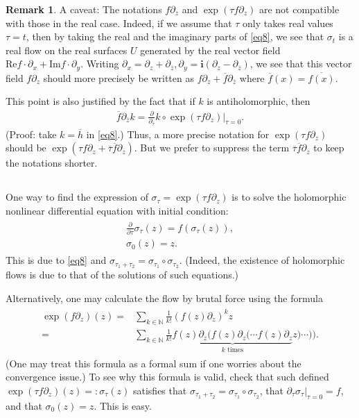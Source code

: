\documentclass[11pt,b5paper,notitlepage]{article}
\theoremstyle{definition}
\newtheorem{rem}[df]{Remark}
\theoremstyle{plain}
\newcommand{\ovl}{\overline}
\newcommand{\im}{\mathbf{i}}
\newcommand{\Nbb}{\mathbb N}
\newcommand{\Real}{\mathrm{Re}}
\newcommand{\Imag}{\mathrm{Im}}
\numberwithin{equation}{section}
\begin{document}
\begin{rem}
A caveat: The notations $f\partial_z$ and $\exp(\tau f\partial_z)$ are not compatible with those in the real case. Indeed, if we assume that $\tau$ only takes real values $\tau=t$, then by taking the real and the imaginary parts of \eqref{eq8}, we see that $\sigma_t$ is a real flow on the real surfaces $U$ generated by the real vector field $\Real f\cdot\partial_x+\Imag f\cdot \partial_y$. Writing $\partial_x=\partial_z+\partial_{\ovl z},\partial_y=\im(\partial_z-\partial_{\ovl z})$, we see that this vector field $f\partial_z$ should more precisely be written as $f\partial_z+\ovl f\partial_{\ovl z}$ where $\ovl f(x)=\ovl {f(x)}$.

This point  is also justified by the fact that if $k$ is antiholomorphic, then
\begin{align}
\ovl f\partial_{\ovl z}k=\frac\partial{\partial_{\ovl \tau}} k\circ \exp (\tau  f\partial_z)\Big|_{\tau=0}.	
\end{align}
(Proof: take $k=\ovl h$  in \eqref{eq8}.) Thus, a more precise notation for $\exp(\tau f\partial_z)$ should be $\exp(\tau f\partial_z+\ovl\tau\ovl f\partial_{\ovl z})$. But we prefer to suppress the term $\ovl\tau\ovl f\partial_{\ovl z}$ to keep the notations shorter.
\end{rem}




\subsection{}

One way to find the expression of $\sigma_\tau=\exp(\tau f\partial_z)$ is to solve the holomorphic nonlinear differential equation with initial condition:
\begin{gather}
\begin{gathered}\label{eq10}
\frac \partial{\partial\tau}\sigma_\tau(z)=f(\sigma_\tau(z)),\\
\sigma_0(z)=z.
\end{gathered}
\end{gather} 
This is due to \eqref{eq8} and $\sigma_{\tau_1+\tau_2}=\sigma_{\tau_1}\circ\sigma_{\tau_2}$. (Indeed, the existence of holomorphic flows is due to that of the solutions of such equations.)

Alternatively, one may calculate the flow by brutal force using the formula
\begin{align}\label{eq14}
\begin{aligned}
\exp(f\partial_z)(z)=&\sum_{k\in\Nbb}\frac 1{k!}(f(z)\partial_z)^kz\\
=&\sum_{k\in\Nbb}\frac 1{k!}\underbrace{f(z)\partial_z\Big(f(z)\partial_z\big(\cdots f(z)\partial_z}_{k\text{ times}} z)\cdots \big)\Big).
\end{aligned}
\end{align}
(One may treat this formula as a formal sum if one worries about the convergence issue.) To see why this formula is valid,  check that such defined $\exp(\tau f\partial_z)(z)=:\sigma_\tau(z)$ satisfies that $\sigma_{\tau_1+\tau_2}=\sigma_{\tau_1}\circ\sigma_{\tau_2}$, that $\partial_\tau\sigma_\tau|_{\tau=0}=f$, and that $\sigma_0(z)=z$. This is easy.
\end{document}
